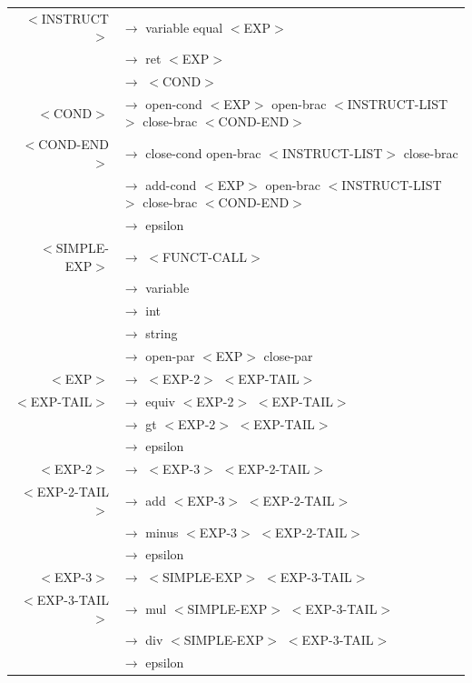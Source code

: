 \documentclass[a4paper,10pt]{article}
\begin{document}
\begin{tabular}{rl}
	$<$INSTRUCT$>$				& $\rightarrow$ variable equal $<$EXP$>$ \\
								& $\rightarrow$ ret $<$EXP$>$ \\
								& $\rightarrow$ $<$COND$>$ \\
	$<$COND$>$					& $\rightarrow$ open-cond $<$EXP$>$ open-brac $<$INSTRUCT-LIST$>$ close-brac $<$COND-END$>$ \\
	$<$COND-END$>$				& $\rightarrow$ close-cond open-brac $<$INSTRUCT-LIST$>$ close-brac \\
								& $\rightarrow$ add-cond $<$EXP$>$ open-brac $<$INSTRUCT-LIST$>$ close-brac $<$COND-END$>$ \\
								& $\rightarrow$ epsilon \\
	$<$SIMPLE-EXP$>$			& $\rightarrow$ $<$FUNCT-CALL$>$ \\
								& $\rightarrow$ variable \\
								& $\rightarrow$ int \\
								& $\rightarrow$ string \\
								& $\rightarrow$ open-par $<$EXP$>$ close-par \\
	$<$EXP$>$					& $\rightarrow$ $<$EXP-2$>$ $<$EXP-TAIL$>$ \\
	$<$EXP-TAIL$>$				& $\rightarrow$ equiv $<$EXP-2$>$ $<$EXP-TAIL$>$ \\
								& $\rightarrow$ gt $<$EXP-2$>$ $<$EXP-TAIL$>$ \\
								& $\rightarrow$ epsilon \\
	$<$EXP-2$>$					& $\rightarrow$ $<$EXP-3$>$ $<$EXP-2-TAIL$>$ \\
	$<$EXP-2-TAIL$>$			& $\rightarrow$ add $<$EXP-3$>$ $<$EXP-2-TAIL$>$ \\
								& $\rightarrow$ minus $<$EXP-3$>$ $<$EXP-2-TAIL$>$ \\
								& $\rightarrow$ epsilon \\
	$<$EXP-3$>$					& $\rightarrow$ $<$SIMPLE-EXP$>$ $<$EXP-3-TAIL$>$ \\
	$<$EXP-3-TAIL$>$			& $\rightarrow$ mul $<$SIMPLE-EXP$>$ $<$EXP-3-TAIL$>$ \\
								& $\rightarrow$ div $<$SIMPLE-EXP$>$ $<$EXP-3-TAIL$>$ \\
								& $\rightarrow$ epsilon \\
					
					
\end{tabular}
\end{document}
